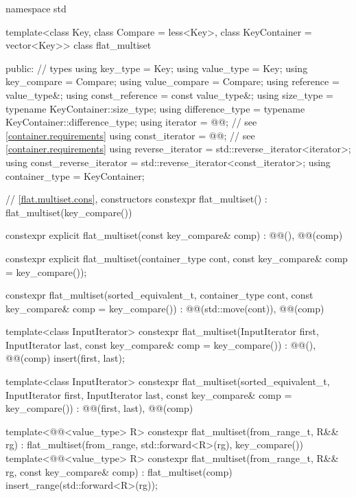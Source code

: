 \begin{codeblock}
namespace std {
  template<class Key, class Compare = less<Key>, class KeyContainer = vector<Key>>
  class flat_multiset {
  public:
    // types
    using key_type                  = Key;
    using value_type                = Key;
    using key_compare               = Compare;
    using value_compare             = Compare;
    using reference                 = value_type&;
    using const_reference           = const value_type&;
    using size_type                 = typename KeyContainer::size_type;
    using difference_type           = typename KeyContainer::difference_type;
    using iterator                  = @@;  // see \ref{container.requirements}
    using const_iterator            = @@;  // see \ref{container.requirements}
    using reverse_iterator          = std::reverse_iterator<iterator>;
    using const_reverse_iterator    = std::reverse_iterator<const_iterator>;
    using container_type            = KeyContainer;

    // \ref{flat.multiset.cons}, constructors
    constexpr flat_multiset() : flat_multiset(key_compare()) { }

    constexpr explicit flat_multiset(const key_compare& comp)
      : @@(), @@(comp) { }

    constexpr explicit flat_multiset(container_type cont,
                                     const key_compare& comp = key_compare());

    constexpr flat_multiset(sorted_equivalent_t, container_type cont,
                            const key_compare& comp = key_compare())
      : @@(std::move(cont)), @@(comp) { }

    template<class InputIterator>
      constexpr flat_multiset(InputIterator first, InputIterator last,
                              const key_compare& comp = key_compare())
        : @@(), @@(comp)
        { insert(first, last); }

    template<class InputIterator>
      constexpr flat_multiset(sorted_equivalent_t, InputIterator first, InputIterator last,
                              const key_compare& comp = key_compare())
        : @@(first, last), @@(comp) { }

    template<@@<value_type> R>
      constexpr flat_multiset(from_range_t, R&& rg)
        : flat_multiset(from_range, std::forward<R>(rg), key_compare()) { }
    template<@@<value_type> R>
      constexpr flat_multiset(from_range_t, R&& rg, const key_compare& comp)
        : flat_multiset(comp)
        { insert_range(std::forward<R>(rg)); }

}}
\end{codeblock}
